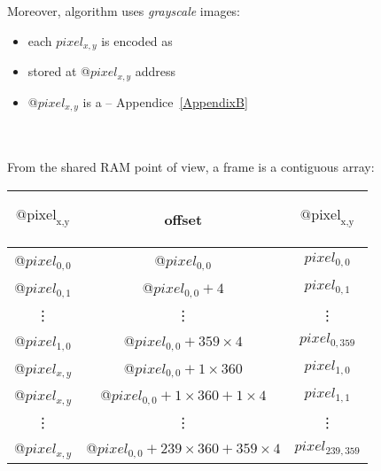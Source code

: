 Moreover,  algorithm uses \emph{grayscale} images:

\begin{itemize}
	\item each $pixel_{x,y}$ is encoded as 
	\item stored at @$pixel_{x,y}$ address
	\item @$pixel_{x,y}$ is a  -- Appendice~\ref{AppendixB}
\end{itemize}\\~\\


From the shared RAM point of view, a frame is a contiguous array:
\begin{center}
\begin{tabular}{|c|c|c|}

	\hline
	\begin{bf}$\text{@pixel}_\text{{x,y}}$\end{bf} & \begin{bf}offset\end{bf} & \begin{bf}$\text{@pixel}_\text{{x,y}}$\end{bf} \\[10pt]

	\hline
	@$pixel_{0,0}$ & @$pixel_{0,0}$ & $pixel_{0,0}$ \\

	\hline
	@$pixel_{0,1}$ & @$pixel_{0,0} + 4$ & $pixel_{0,1}$ \\

	\hline
	\vdots & \vdots & \vdots \\

	\hline
	@$pixel_{1,0}$ & @$pixel_{0,0} + 359\times 4$ & $pixel_{0,359}$ \\

	\hline
	@$pixel_{x,y}$ & @$pixel_{0,0} + 1\times 360$ & $pixel_{1,0}$ \\

	\hline
	@$pixel_{x,y}$ & @$pixel_{0,0} + 1\times 360 + 1\times 4$ & $pixel_{1,1}$ \\

	\hline
	\vdots & \vdots & \vdots \\

	\hline
	@$pixel_{x,y}$ & @$pixel_{0,0} + 239\times 360 + 359\times 4$ & $pixel_{239,359}$ \\

	\hline

\end{tabular}
\end{center}
\FloatBarrier

